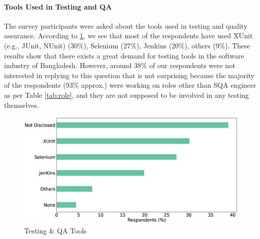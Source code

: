 \paragraph{Tools Used in Testing and QA}
The survey participants were asked about the tools used in testing and quality assurance. According to \ref{fig:testingTools}, we see that most of the respondents have used XUnit (e.g., JUnit, NUnit) (30\%), Selenium (27\%), Jenkins (20\%), others (9\%). These results show that there exists a great demand for testing tools in the software industry of Bangladesh. However, around 38\% of our respondents were not interested in replying to this question that is not surprising because the majority of the respondents (93\% approx.) were working on roles other than SQA engineer as per Table \ref{tab:role}, and they are not supposed to be involved in any testing themselves.  

\begin{figure}[h]
\centering
  \includegraphics[scale=0.18]{Figures/Respondents_testing_tools}
  \caption{Testing \& QA Tools}
  \label{fig:testingTools}
\end{figure}



